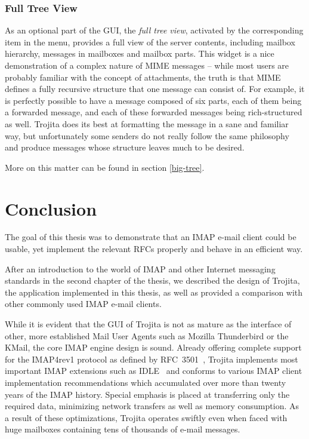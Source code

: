 \documentclass[12pt,notitlepage]{report}
\newcommand{\trojita}{Trojita\xspace}
\begin{document}
\subsection{Full Tree View}

As an optional part of the GUI, the {\em full tree view}, activated by the
corresponding item in the menu, provides a full view of the server contents,
including mailbox hierarchy, messages in mailboxes and mailbox parts.  This
widget is a nice demonstration of a complex nature of MIME messages -- while
most users are probably familiar with the concept of attachments, the truth is
that MIME defines a fully recursive structure that one message can consist of.
For example, it is perfectly possible to have a message composed of six parts,
each of them being a forwarded message, and each of these forwarded messages
being rich-structured as well.  \trojita does its best at formatting the message
in a sane and familiar way, but unfortunately some senders do not really follow
the same philosophy and produce messages whose structure leaves much to be
desired.

More on this matter can be found in section \ref{big-tree}.

\chapter{Conclusion}

The goal of this thesis was to demonstrate that an IMAP e-mail client could be
usable, yet implement the relevant RFCs properly and behave in an efficient way.

After an introduction to the world of IMAP and other Internet messaging
standards in the second chapter of the thesis, we described the design of
\trojita, the application implemented in this thesis, as well as provided a
comparison with other commonly used IMAP e-mail clients.

While it is evident that the GUI of \trojita is not as mature as the interface
of other, more established Mail User Agents such as Mozilla Thunderbird or the
KMail, the core IMAP engine design is sound.  Already offering complete support
for the IMAP4rev1 protocol as defined by RFC~3501~\cite{rfc-imap}, \trojita
implements most important IMAP extensions such as IDLE~\cite{rfc-idle} and
conforms to various IMAP client implementation recommendations which accumulated
over more than twenty years of the IMAP history.  Special emphasis is placed at
transferring only the required data, minimizing network transfers as well as
memory consumption.  As a result of these optimizations, \trojita operates
swiftly even when faced with huge mailboxes containing tens of thousands of
e-mail messages.
\end{document}
